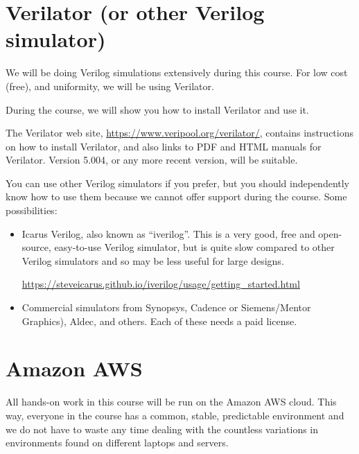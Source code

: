 
\section{Verilator (or other Verilog simulator)}

We will be doing Verilog simulations extensively during this course.
For low cost (free), and uniformity, we will be using Verilator.

During the course, we will show you how to install Verilator and use it.

The Verilator web site, \url{https://www.veripool.org/verilator/},
contains instructions on how to install Verilator, and also links to
PDF and HTML manuals for Verilator.  Version 5.004, or any more recent
version, will be suitable.

You can use other Verilog simulators if you prefer, but you should
independently know how to use them because we cannot offer support
during the course.  Some possibilities:

\begin{itemize}

  \item Icarus Verilog, also known as ``iverilog''.  This is a very
    good, free and open-source, easy-to-use Verilog simulator, but is
   quite slow compared to other Verilog simulators and so may be less
    useful for large designs.

    \url{https://steveicarus.github.io/iverilog/usage/getting_started.html}

  \item Commercial simulators from Synopsys, Cadence or Siemens/Mentor
    Graphics), Aldec, and others.  Each of these needs a paid license.

\end{itemize}


\section{Amazon AWS}

\label{sec_AWS}

All hands-on work in this course will be run on the Amazon AWS cloud.
This way, everyone in the course has a common, stable, predictable
environment and we do not have to waste any time dealing with the
countless variations in environments found on different laptops and
servers.

